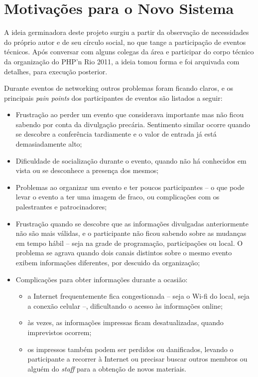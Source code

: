 \documentclass[12pt,a4paper,twoside,hyphens,english,brazil]{abntex2}
\begin{document}
\section{Motivações para o Novo Sistema}
A ideia germinadora deste projeto surgiu a partir da observação de necessidades do próprio autor e de seu círculo social, no que tange a participação de eventos técnicos. Após conversar com alguns colegas da área e participar do corpo técnico da organização do PHP'n Rio 2011, a ideia tomou forma e foi arquivada com detalhes, para execução posterior.

Durante eventos de networking outros problemas foram ficando claros, e os principais \emph{pain points} dos participantes de eventos são listados a seguir:

\begin{itemize}
	\item Frustração ao perder um evento que considerava importante mas não ficou sabendo por conta da divulgação precária. Sentimento similar ocorre quando se descobre a conferência tardiamente e o valor de entrada já está demasiadamente alto;
	\item Dificuldade de socialização durante o evento, quando não há conhecidos em vista ou se desconhece a presença dos mesmos;
	\item Problemas ao organizar um evento e ter poucos participantes -- o que pode levar o evento a ter uma imagem de fraco, ou complicações com os palestrantes e patrocinadores;
	\item Frustração quando se descobre que as informações divulgadas anteriormente não são mais válidas, e o participante não ficou sabendo sobre as mudanças em tempo hábil -- seja na grade de programação, participações ou local. O problema se agrava quando dois canais distintos sobre o mesmo evento exibem informações diferentes, por descuido da organização;
	\item Complicações para obter informações durante a ocasião:
		\begin{itemize}
			\item a Internet frequentemente fica congestionada -- seja o Wi-fi do local, seja a conexão celular --, dificultando o acesso às informações online;
			\item às vezes, as informações impressas ficam desatualizadas, quando imprevistos ocorrem;
			\item os impressos também podem ser perdidos ou danificados, levando o participante a recorrer à Internet ou precisar buscar outros membros ou alguém do \emph{staff} para a obtenção de novos materiais.
		\end{itemize} 
\end{itemize}
\end{document}
